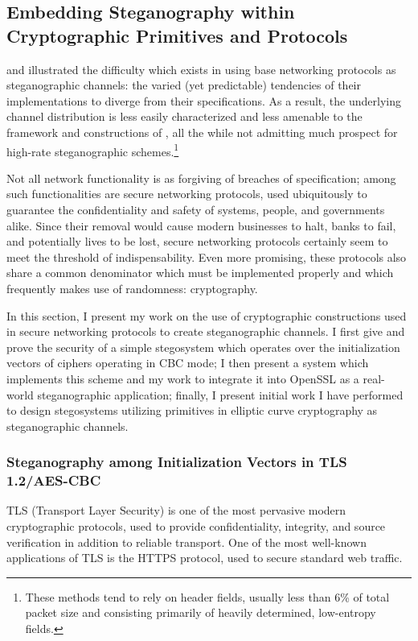 \documentclass{article}
\begin{document}
\subsection{Embedding Steganography within Cryptographic Primitives and Protocols}

\cite{HICCUPS} and \cite{MurdochLewis} illustrated the difficulty which exists in using 
base networking protocols as steganographic channels: the varied (yet predictable) tendencies 
of their implementations to diverge from their specifications.  As a result, the underlying 
channel distribution is less easily characterized and less amenable to the framework and constructions of \cite{BiglouPSS}, 
all the while not admitting much prospect for high-rate steganographic schemes.\footnote{These methods tend to rely on header fields, usually less than 6\% of 
total packet size and consisting primarily of heavily determined, low-entropy fields.}

Not all network functionality is as forgiving of breaches of specification; among such functionalities 
are secure networking protocols, used ubiquitously to guarantee the confidentiality and safety of 
systems, people, and governments alike.  Since their removal would cause modern businesses to halt, 
banks to fail, and potentially lives to be lost, secure networking protocols certainly seem to meet 
the threshold of indispensability.  Even more promising, these protocols also share a common denominator which must be 
implemented properly and which frequently makes use of randomness: cryptography.  

In this section, I present my work on the use of cryptographic constructions used in secure networking protocols
to create steganographic channels.  I first give and prove the security of a simple stegosystem which operates over the 
initialization vectors of ciphers operating in CBC mode; I then present a system which implements this scheme and my work 
to integrate it into OpenSSL as a real-world steganographic application; finally, I present initial work I have performed 
to design stegosystems utilizing primitives in elliptic curve cryptography as steganographic channels.

\subsubsection{Steganography among Initialization Vectors in TLS 1.2/AES-CBC}

TLS (Transport Layer Security) is one of the most pervasive modern cryptographic protocols, used 
to provide confidentiality, integrity, and source verification in addition to reliable transport.  One of the 
most well-known applications of TLS is the HTTPS protocol, used to secure standard web traffic.
\end{document}
